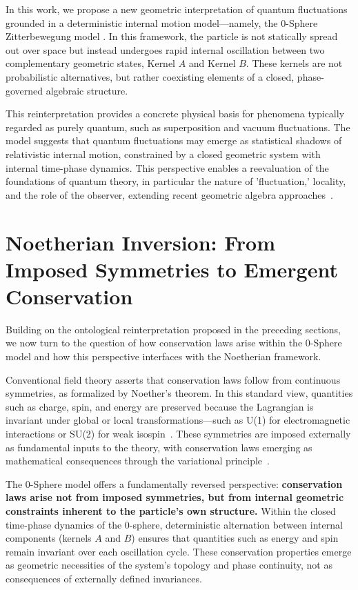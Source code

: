 \documentclass[%
 reprint,
 amsmath,amssymb,
 aps,
]{revtex4-1}
\numberwithin{equation}{section}%
\begin{document}
In this work, we propose a new geometric interpretation of quantum fluctuations grounded in a deterministic internal motion model—namely, the 0-Sphere Zitterbewegung model \cite{schrodinger1930}. In this framework, the particle is not statically spread out over space but instead undergoes rapid internal oscillation between two complementary geometric states, Kernel $A$ and Kernel $B$. These kernels are not probabilistic alternatives, but rather coexisting elements of a closed, phase-governed algebraic structure.

This reinterpretation provides a concrete physical basis for phenomena typically regarded as purely quantum, such as superposition and vacuum fluctuations. The model suggests that quantum fluctuations may emerge as statistical shadows of relativistic internal motion, constrained by a closed geometric system with internal time-phase dynamics. This perspective enables a reevaluation of the foundations of quantum theory, in particular the nature of 'fluctuation,' locality, and the role of the observer, extending recent geometric algebra approaches~\cite{hestenes2010}.


\section{Noetherian Inversion: From Imposed Symmetries to Emergent Conservation}

Building on the ontological reinterpretation proposed in the preceding sections, we now turn to the question of how conservation laws arise within the 0-Sphere model and how this perspective interfaces with the Noetherian framework.

Conventional field theory asserts that conservation laws follow from continuous symmetries, as formalized by Noether's theorem. In this standard view, quantities such as charge, spin, and energy are preserved because the Lagrangian is invariant under global or local transformations—such as U(1) for electromagnetic interactions or SU(2) for weak isospin~\cite{tinkham1964}. These symmetries are imposed externally as fundamental inputs to the theory, with conservation laws emerging as mathematical consequences through the variational principle~\cite{hill1951}.

The 0-Sphere model offers a fundamentally reversed perspective: \textbf{conservation laws arise not from imposed symmetries, but from internal geometric constraints inherent to the particle's own structure.} Within the closed time-phase dynamics of the 0-sphere, deterministic alternation between internal components (kernels $A$ and $B$) ensures that quantities such as energy and spin remain invariant over each oscillation cycle. These conservation properties emerge as geometric necessities of the system's topology and phase continuity, not as consequences of externally defined invariances.
\end{document}
